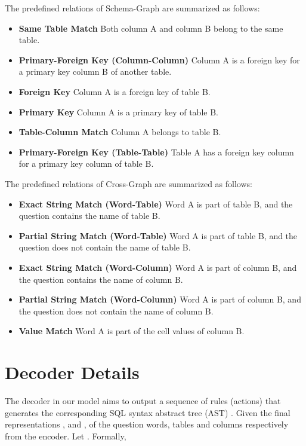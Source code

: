 \documentclass{article}
\begin{document}
The predefined relations of Schema-Graph are summarized as follows:
\begin{itemize}
    \item \textbf{Same Table Match}
Both column A and column B belong to the same table. 
    \item \textbf{Primary-Foreign Key (Column-Column)}
Column A is a foreign key for a primary key column B of another table.   
    \item \textbf{Foreign Key}
Column A is a foreign key of table B.  

    \item  \textbf{Primary Key}
Column A is a primary key of table B. 

    \item \textbf{Table-Column Match}
Column A belongs to table B.    

    \item \textbf{Primary-Foreign Key (Table-Table)}
Table A has a foreign key column for a primary key column of table B.   
\end{itemize}

The predefined relations of Cross-Graph are summarized as follows:
\begin{itemize}
    \item \textbf{Exact String Match (Word-Table)}
Word A is part of table B, and the question contains the name of table B. 

    \item \textbf{Partial String Match (Word-Table)}
Word A is part of table B, and the question does not contain the name of table B.      

    \item \textbf{Exact String Match (Word-Column)}
Word A is part of column B, and the question contains the name of column B.   

    \item \textbf{Partial String Match (Word-Column)}
Word A is part of column B, and the question does not contain the name of column B.      

    \item \textbf{Value Match}
Word A is part of the cell values of column B.
\end{itemize} 


\section{Decoder Details}
\label{app_decoder_details}
The decoder in our model aims to output a sequence of rules (actions) that generates the corresponding SQL syntax abstract tree (AST) \citep{yin2017syntactic}.
Given the final representations ,  and , of the question words, tables and columns respectively from the encoder.
Let .
Formally,
\end{document}

